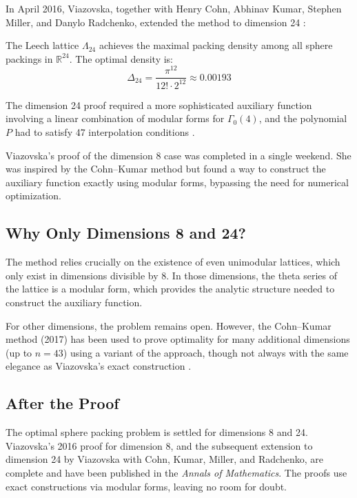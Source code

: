 In April 2016, Viazovska, together with Henry Cohn, Abhinav Kumar, Stephen Miller, and Danylo Radchenko, extended the method to dimension 24 \cite{cohn2017}:

\begin{theorem}
The Leech lattice $\Lambda_{24}$ achieves the maximal packing density among all sphere packings in $\mathbb{R}^{24}$. The optimal density is:
\begin{equation}
\Delta_{24} = \frac{\pi^{12}}{12! \cdot 2^{12}} \approx 0.00193
\end{equation}
\end{theorem}

The dimension 24 proof required a more sophisticated auxiliary function involving a linear combination of modular forms for $\Gamma_0(4)$, and the polynomial $P$ had to satisfy 47 interpolation conditions \cite{cohn2017}.

\begin{highlightbox}
Viazovska's proof of the dimension 8 case was completed in a single weekend. She was inspired by the Cohn--Kumar method but found a way to construct the auxiliary function exactly using modular forms, bypassing the need for numerical optimization.
\end{highlightbox}

\subsection{Why Only Dimensions 8 and 24?}

The method relies crucially on the existence of even unimodular lattices, which only exist in dimensions divisible by 8. In those dimensions, the theta series of the lattice is a modular form, which provides the analytic structure needed to construct the auxiliary function.

For other dimensions, the problem remains open. However, the Cohn--Kumar method (2017) has been used to prove optimality for many additional dimensions (up to $n = 43$) using a variant of the approach, though not always with the same elegance as Viazovska's exact construction \cite{cohn2017b}.

\subsection{After the Proof}

The optimal sphere packing problem is settled for dimensions 8 and 24. Viazovska's 2016 proof for dimension 8, and the subsequent extension to dimension 24 by Viazovska with Cohn, Kumar, Miller, and Radchenko, are complete and have been published in the \emph{Annals of Mathematics}. The proofs use exact constructions via modular forms, leaving no room for doubt.

